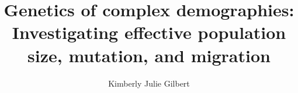 \documentclass[
12pt         %
,twoside     %
,openright   %
]{mythesis}
\title{Genetics of complex demographies: 
  Investigating effective population size, mutation, and migration}
\author{Kimberly Julie Gilbert}
\begin{document}
\maketitle




\allcontents


\cleardoublepage
\mainbody








\formatbibliography



\formatappendices

\end{document}
